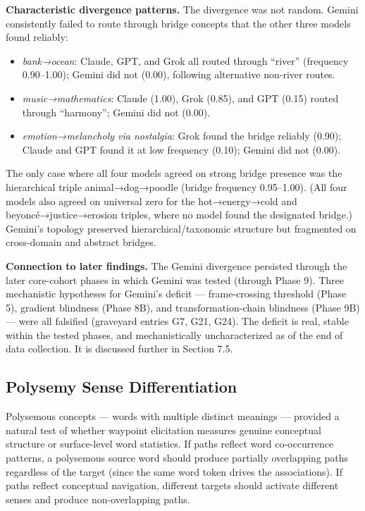 \textbf{Characteristic divergence patterns.} The divergence was not random. Gemini consistently failed to route through bridge concepts that the other three models found reliably:

\begin{itemize}
\tightlist
\item
  \emph{bank→ocean}: Claude, GPT, and Grok all routed through ``river'' (frequency 0.90--1.00); Gemini did not (0.00), following alternative non-river routes.
\item
  \emph{music→mathematics}: Claude (1.00), Grok (0.85), and GPT (0.15) routed through ``harmony''; Gemini did not (0.00).
\item
  \emph{emotion→melancholy via nostalgia}: Grok found the bridge reliably (0.90); Claude and GPT found it at low frequency (0.10); Gemini did not (0.00).
\end{itemize}

The only case where all four models agreed on strong bridge presence was the hierarchical triple animal→dog→poodle (bridge frequency 0.95--1.00). (All four models also agreed on universal zero for the hot→energy→cold and beyoncé→justice→erosion triples, where no model found the designated bridge.) Gemini's topology preserved hierarchical/taxonomic structure but fragmented on cross-domain and abstract bridges.

\textbf{Connection to later findings.} The Gemini divergence persisted through the later core-cohort phases in which Gemini was tested (through Phase 9). Three mechanistic hypotheses for Gemini's deficit --- frame-crossing threshold (Phase 5), gradient blindness (Phase 8B), and transformation-chain blindness (Phase 9B) --- were all falsified (graveyard entries G7, G21, G24). The deficit is real, stable within the tested phases, and mechanistically uncharacterized as of the end of data collection. It is discussed further in Section 7.5.

\subsection{Polysemy Sense Differentiation}\label{polysemy-sense-differentiation}

Polysemous concepts --- words with multiple distinct meanings --- provided a natural test of whether waypoint elicitation measures genuine conceptual structure or surface-level word statistics. If paths reflect word co-occurrence patterns, a polysemous source word should produce partially overlapping paths regardless of the target (since the same word token drives the associations). If paths reflect conceptual navigation, different targets should activate different senses and produce non-overlapping paths.


